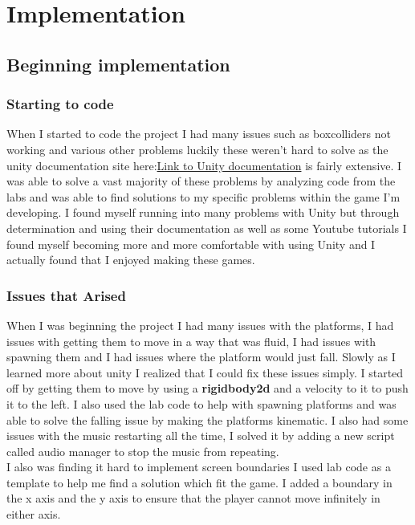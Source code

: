 \documentclass{report}
\begin{document}
\chapter{Implementation}
\section{Beginning implementation}
\subsection{Starting to code}
When I started to code the project I had many issues such as boxcolliders not working and various other problems luckily these weren't  hard to solve as the unity documentation site here:\href{https://docs.unity3d.com/Manual/index.html}{Link to Unity documentation} is fairly extensive.  I was able to solve a vast majority of these problems by analyzing code from the labs and was able to find solutions to my specific problems within the game I'm developing.  I found myself running into many problems with Unity but through determination and using their documentation as well as some Youtube tutorials I found myself becoming more and more comfortable with using Unity and I actually found that I enjoyed making these games.
\subsection{Issues that Arised}
When I was beginning the project I had many issues with the platforms, I had issues with getting them to move in a way that was fluid, I had issues with spawning them and I had issues where the platform would just fall.  Slowly as I learned more about unity I realized that I could fix these issues simply. I started off by getting them to move by using a \textbf{rigidbody2d}\cite{RigidBody} and a velocity to it to push it to the left. I also used the lab code to help with spawning platforms and was able to solve the falling issue by making the platforms kinematic.  I also had some issues with the music restarting all the time, I solved it by adding a new script called audio manager to stop the music from repeating.
\\
I also was finding it hard to implement screen boundaries I used lab code as a template to help me find a solution which fit the game.  I added a boundary in the x axis and the y axis to ensure that the player cannot move infinitely in either axis.
\end{document}
